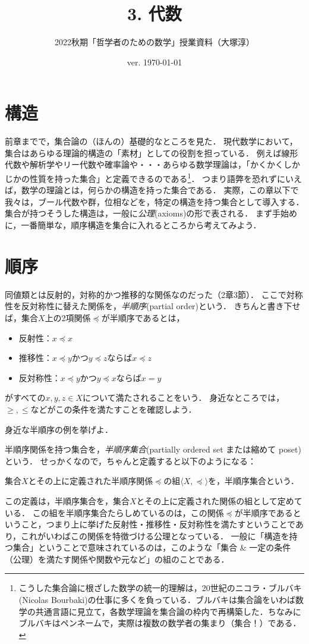 \documentclass[11pt,a4paper]{jsarticle}
\begin{document}
\title{3. 代数}
\author{2022秋期「哲学者のための数学」授業資料（大塚淳）}
\date{ver. \today}
\maketitle

\section{構造}
前章までで，集合論の（ほんの）基礎的なところを見た．
現代数学において，集合はあらゆる理論的構造の「素材」としての役割を担っている．
例えば線形代数や解析学やリー代数や確率論や・・・あらゆる数学理論は，「かくかくしかじかの性質を持った集合」と定義できるのである\footnote{こうした集合論に根ざした数学の統一的理解は，20世紀のニコラ・ブルバキ(Nicolas Bourbaki)の仕事に多くを負っている．ブルバキは集合論をいわば数学の共通言語に見立て，各数学理論を集合論の枠内で再構築した．ちなみにブルバキはペンネームで，実際は複数の数学者の集まり（集合！）である．}．
つまり語弊を恐れずにいえば，数学の理論とは，何らかの構造を持った集合である．
実際，この章以下で我々は，ブール代数や群，位相などを，特定の構造を持つ集合として導入する．
集合が持つそうした構造は，一般に\emph{公理}(axioms)の形で表される．
まず手始めに，一番簡単な，順序構造を集合に入れるところから考えてみよう．


\section{順序}
同値類とは反射的，対称的かつ推移的な関係なのだった（2章3節）．
ここで対称性を反対称性に替えた関係を，\emph{半順序}(partial order)という．
きちんと書き下せば，集合$X$上の2項関係$\preceq$が半順序であるとは，
\begin{itemize}
 \item 反射性：$x \preceq x$
 \item 推移性：$x \preceq y$かつ$y \preceq z$ならば$x \preceq z$
 \item 反対称性：$x \preceq y$かつ$y \preceq x$ならば$x = y$
\end{itemize}
がすべての$x, y, z\in X$について満たされることをいう．
身近なところでは，$\geq, \leq$などがこの条件を満たすことを確認しよう．

\begin{exercise}
 身近な半順序の例を挙げよ．
\end{exercise}

半順序関係を持つ集合を，\emph{半順序集合}(partially ordered set または縮めて poset)という．
せっかくなので，ちゃんと定義すると以下のようになる：
\begin{dfn}[半順序集合]
 集合$X$とその上に定義された半順序関係$\preceq$の組$\langle X, \preceq \rangle$を，半順序集合という．
\end{dfn}
この定義は，半順序集合を，集合$X$とその上に定義された関係の組として定めている．
この組を半順序集合たらしめているのは，この関係$\preceq$が半順序であるということ，つまり上に挙げた反射性・推移性・反対称性を満たすということであり，これがいわばこの関係を特徴づける公理となっている．
一般に「構造を持つ集合」ということで意味されているのは，このような「集合 \& 一定の条件（公理）を満たす関係や関数や元など」の組のことである．
\end{document}
